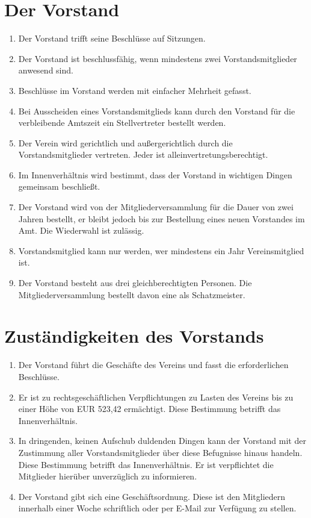 \documentclass[a4paper, 12pt]{scrartcl}
\begin{document}
\section{Der Vorstand}
\begin{enumerate}
	\item Der Vorstand trifft seine Beschlüsse auf Sitzungen.
	\item Der Vorstand ist beschlussfähig, wenn mindestens zwei Vorstandsmitglieder anwesend sind.
	\item Beschlüsse im Vorstand werden mit einfacher Mehrheit gefasst.
	\item Bei Ausscheiden eines Vorstandsmitglieds kann durch den Vorstand für die verbleibende Amtszeit ein Stellvertreter bestellt werden.
	\item Der Verein wird gerichtlich und außergerichtlich durch die Vorstandsmitglieder vertreten. Jeder ist alleinvertretungsberechtigt.
	\item Im Innenverhältnis wird bestimmt, dass der Vorstand in wichtigen Dingen gemeinsam beschließt.
	\item Der Vorstand wird von der Mitgliederversammlung für die Dauer von zwei Jahren bestellt, er bleibt jedoch bis zur Bestellung eines neuen Vorstandes im Amt. Die Wiederwahl ist zulässig.
	\item Vorstandsmitglied kann nur werden, wer mindestens ein Jahr Vereinsmitglied ist.
	\item Der Vorstand besteht aus drei gleichberechtigten Personen. Die Mitgliederversammlung bestellt davon eine als Schatzmeister.
\end{enumerate}

\section{Zuständigkeiten des Vorstands}
\begin{enumerate}
	\item Der Vorstand führt die Geschäfte des Vereins und fasst die erforderlichen Beschlüsse.
	\item Er ist zu rechtsgeschäftlichen Verpflichtungen zu Lasten des Vereins bis zu einer Höhe von EUR 523,42 ermächtigt. Diese Bestimmung betrifft das Innenverhältnis.
	\item In dringenden, keinen Aufschub duldenden Dingen kann der Vorstand mit der Zustimmung aller Vorstandsmitglieder über diese Befugnisse hinaus handeln. Diese Bestimmung betrifft das Innenverhältnis. Er ist verpflichtet die Mitglieder hierüber unverzüglich zu informieren.
	\item Der Vorstand gibt sich eine Geschäftsordnung. Diese ist den Mitgliedern innerhalb einer Woche schriftlich oder per E-Mail zur Verfügung zu stellen.
\end{enumerate}
\end{document}
